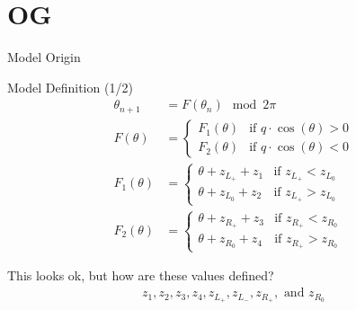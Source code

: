 \section{OG}

\begin{frame}{Model Origin}
\end{frame}

\begin{frame}{Model Definition (1/2)}
	\vspace{-2.0em}
	\begin{align}
		\theta_{n+1} & =  F(\theta_n) \mod 2 \pi
		\\
		F(\theta)    & = \begin{cases}
			                 F_1(\theta) & \text{if } q \cdot \cos(\theta) > 0 \\
			                 F_2(\theta) & \text{if } q \cdot \cos(\theta) < 0
		                 \end{cases}
		\\
		F_1(\theta)  & = \begin{cases}
			                 \theta + z_{L_+} + z_1 & \text{if } z_{L_+} < z_{L_0} \\
			                 \theta + z_{L_0} + z_2 & \text{if } z_{L_+} > z_{L_0}
		                 \end{cases}
		\\
		F_2(\theta)  & = \begin{cases}
			                 \theta + z_{R_+} + z_3 & \text{if } z_{R_+} < z_{R_0} \\
			                 \theta + z_{R_0} + z_4 & \text{if } z_{R_+} > z_{R_0}
		                 \end{cases}
	\end{align}

	\pause
	\vspace{2em}
	This looks ok, but how are these values defined?
	\begin{align*}
		z_1, z_2, z_3, z_4, z_{L_+}, z_{L_-}, z_{R_+}, \text{ and } z_{R_0}
	\end{align*}
\end{frame}

